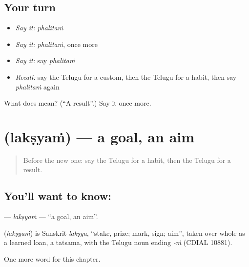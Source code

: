 \subsection*{Your turn}
\begin{itemize}
\raggedright
  \item \emph{Say it:} \emph{phalitaṁ}
  \item \emph{Say it:} \emph{phalitaṁ}, once more
  \item \emph{Say it:} say \emph{phalitaṁ}
  \item \emph{Recall:} say the Telugu for a custom, then the Telugu for a habit, then say \emph{phalitaṁ} again
\end{itemize}

\begin{tcolorbox}[breakable,colback=teal!4,colframe=teal!35!black,title={Before you move on}]
What does  mean? (\textquotedblleft{}A result\textquotedblright{}.) Say it once more.
\end{tcolorbox}
\section[\texorpdfstring{\te{లక్ష్యం} (lakṣyaṁ)}{లక్ష్యం (lakṣyaṁ)}]{ (lakṣyaṁ) — a goal, an aim}

\label{lesson:TE-C218-laksyam}



\begin{quote}
Before the new one: say the Telugu for a habit, then the Telugu for a result.
\end{quote}

\subsection*{You'll want to know: }
\textbf{} — \emph{lakṣyaṁ} — \textquotedblleft{}a goal, an aim\textquotedblright{}.

\begin{cousinweb}
\textbf{} (\emph{lakṣyaṁ}) is Sanskrit \emph{lakṣya}, \textquotedblleft{}stake, prize; mark, sign; aim\textquotedblright{}, taken over whole as a learned loan, a tatsama, with the Telugu noun ending \emph{-ṁ} (CDIAL 10881).
\end{cousinweb}

\begin{grammarlens}[title={What you've built}]
One more word for this chapter.
\end{grammarlens}

